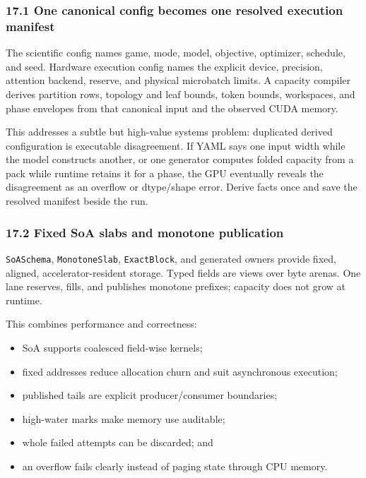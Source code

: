 \documentclass[
  10pt,
  letterpaper,
]{article}
\providecommand{\tightlist}{%
  \setlength{\itemsep}{0pt}\setlength{\parskip}{0pt}}
\begin{document}
\subsubsection{17.1 One canonical config becomes one resolved execution
manifest}\label{171-one-canonical-config-becomes-one-resolved-execution-manifest}

The scientific config names game, mode, model, objective, optimizer,
schedule, and seed. Hardware execution config names the explicit device,
precision, attention backend, reserve, and physical microbatch limits. A
capacity compiler derives partition rows, topology and leaf bounds,
token bounds, workspaces, and phase envelopes from that canonical input
and the observed CUDA memory.

This addresses a subtle but high-value systems problem: duplicated
derived configuration is executable disagreement. If YAML says one input
width while the model constructs another, or one generator computes
folded capacity from a pack while runtime retains it for a phase, the
GPU eventually reveals the disagreement as an overflow or dtype/shape
error. Derive facts once and save the resolved manifest beside the run.

\subsubsection{17.2 Fixed SoA slabs and monotone
publication}\label{172-fixed-soa-slabs-and-monotone-publication}

\texttt{SoASchema}, \texttt{MonotoneSlab}, \texttt{ExactBlock}, and
generated owners provide fixed, aligned, accelerator-resident storage.
Typed fields are views over byte arenas. One lane reserves, fills, and
publishes monotone prefixes; capacity does not grow at runtime.

This combines performance and correctness:

\begin{itemize}
\tightlist
\item
  SoA supports coalesced field-wise kernels;
\item
  fixed addresses reduce allocation churn and suit asynchronous
  execution;
\item
  published tails are explicit producer/consumer boundaries;
\item
  high-water marks make memory use auditable;
\item
  whole failed attempts can be discarded; and
\item
  an overflow fails clearly instead of paging state through CPU memory.
\end{itemize}
\end{document}
